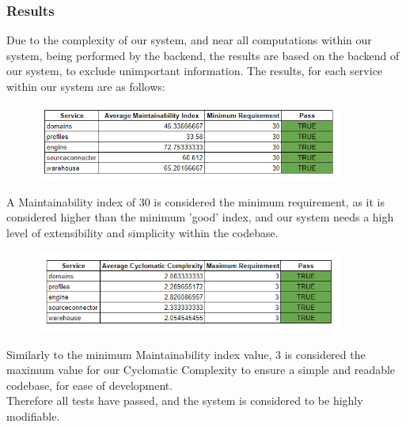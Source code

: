 \documentclass[12pt]{article}
\begin{document}
\subsubsection{Results}
Due to the complexity of our system, and near all computations within our system, being performed by the backend, the results are based on the backend of our system, to exclude unimportant information.
The results, for each service within our system are as follows:
\begin{figure}[H]
    \centering
    \includegraphics[width=0.9\textwidth]{Maintainability.png}
\end{figure}
A Maintainability index of 30 is considered the minimum requirement, as it is considered higher than the minimum 'good' index, and our system needs a high level of extensibility and simplicity within the codebase.
\begin{figure}[H]
    \centering
    \includegraphics[width=0.9\textwidth]{Cyclomatic.png}
\end{figure}
Similarly to the minimum Maintainability index value, 3 is considered the maximum value for our Cyclomatic Complexity to ensure a simple and readable codebase, for ease of development.
\\Therefore all tests have passed, and the system is considered to be highly modifiable.
\newpage
\end{document}
